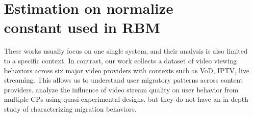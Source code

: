 
\section{Estimation on normalize \\ constant used in RBM} \label{sec:rbm}


These works usually focus on one single system, and their analysis is also limited to a specific context. In contrast, our work collects a dataset of video viewing behaviors across six major video providers with contexts such as VoD, IPTV, live streaming. This allows us to understand user migratory patterns across content providers. \cite{roberts1997weak} analyze the influence of video stream quality on user behavior from multiple CPs using quasi-experimental designs, but they do not have an in-depth study of characterizing migration behaviors.  
